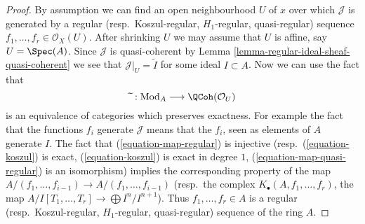 \begin{proof}
By assumption we can find an open neighbourhood $U$ of $x$ over which
$\mathcal{J}$ is generated by a
regular (resp.\ Koszul-regular, $H_1$-regular, quasi-regular)
sequence $f_1, \ldots, f_r \in \mathcal{O}_X(U)$. After shrinking
$U$ we may assume that $U$ is affine, say $U = \Spec(A)$.
Since $\mathcal{J}$ is quasi-coherent by
Lemma \ref{lemma-regular-ideal-sheaf-quasi-coherent}
we see that $\mathcal{J}|_U = \widetilde{I}$ for some ideal $I \subset A$.
Now we can use the fact that
$$
\widetilde{\ } : \text{Mod}_A \longrightarrow \QCoh(\mathcal{O}_U)
$$
is an equivalence of categories which preserves exactness. For example
the fact that the functions $f_i$ generate $\mathcal{J}$ means that
the $f_i$, seen as elements of $A$ generate $I$. The fact that
(\ref{equation-map-regular}) is injective
(resp.\ (\ref{equation-koszul}) is exact, (\ref{equation-koszul}) is exact
in degree $1$, (\ref{equation-map-quasi-regular}) is an isomorphism)
implies the corresponding property of the map
$A/(f_1, \ldots, f_{i - 1}) \to A/(f_1, \ldots, f_{i - 1})$
(resp.\ the complex $K_\bullet(A, f_1, \ldots, f_r)$, the
map $A/I[T_1, \ldots, T_r] \to \bigoplus I^n/I^{n + 1}$).
Thus $f_1, \ldots, f_r \in A$ is a regular
(resp.\ Koszul-regular, $H_1$-regular, quasi-regular)
sequence of the ring $A$.
\end{proof}

